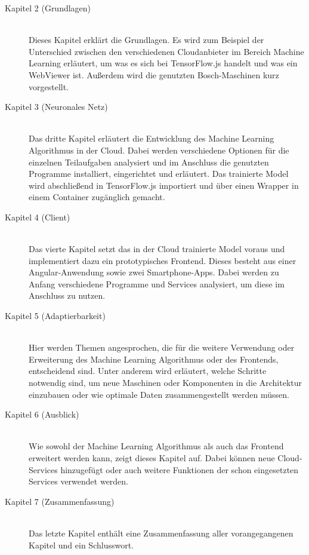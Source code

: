 \begin{description}

    \item[Kapitel 2 (Grundlagen)]\hfill \\
    Dieses Kapitel erklärt die Grundlagen. Es wird zum Beispiel der Unterschied zwischen den verschiedenen Cloudanbieter
    im Bereich Machine Learning erläutert, um was es sich bei TensorFlow.js handelt und was ein WebViewer ist. Außerdem
    wird die genutzten Bosch-Maschinen kurz vorgestellt.

    \item[Kapitel 3 (Neuronales Netz)]\hfill \\
    Das dritte Kapitel erläutert die Entwicklung des Machine Learning Algorithmus in der Cloud. Dabei werden verschiedene
    Optionen für die einzelnen Teilaufgaben analysiert und im Anschluss die genutzten Programme installiert, eingerichtet
    und erläutert. Das trainierte Model wird abschließend in TensorFlow.js importiert und über einen Wrapper in einem
    Container zugänglich gemacht.

    \item[Kapitel 4 (Client)]\hfill \\
    Das vierte Kapitel setzt das in der Cloud trainierte Model voraus und implementiert dazu ein prototypisches Frontend.
    Dieses besteht aus einer Angular-Anwendung sowie zwei Smartphone-Apps. Dabei werden zu Anfang verschiedene Programme
    und Services analysiert, um diese im Anschluss zu nutzen.

    \item[Kapitel 5 (Adaptierbarkeit)]\hfill \\
    Hier werden Themen angesprochen, die für die weitere Verwendung oder Erweiterung des Machine Learning Algorithmus
    oder des Frontends, entscheidend sind. Unter anderem wird erläutert, welche Schritte notwendig sind, um neue Maschinen
    oder Komponenten in die Architektur einzubauen oder wie optimale Daten zusammengestellt werden müssen.

    \item[Kapitel 6 (Ausblick)]\hfill \\
    Wie sowohl der Machine Learning Algorithmus als auch das Frontend erweitert werden kann, zeigt dieses Kapitel auf.
    Dabei können neue Cloud-Services hinzugefügt oder auch weitere Funktionen der schon eingesetzten Services verwendet
    werden.

    \item[Kapitel 7 (Zusammenfassung)]\hfill \\
    Das letzte Kapitel enthält eine Zusammenfassung aller vorangegangenen Kapitel und ein Schlusswort.

\end{description}